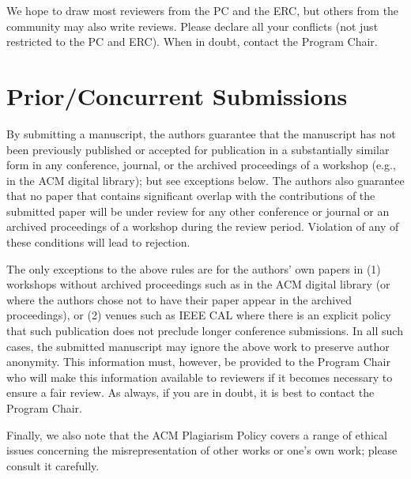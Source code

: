 \documentclass{sig-alternate}
\begin{document}
We hope to draw most reviewers from the PC and the ERC, but others from the community may also write reviews. Please declare all your conflicts (not just restricted to the PC and ERC). When in doubt, contact the Program Chair.

\section{Prior/Concurrent Submissions}

By submitting a manuscript, the authors guarantee that the manuscript has not been previously published or accepted for publication in a substantially similar form in any conference, journal, or the archived proceedings of a workshop (e.g., in the ACM digital library); but see exceptions below. The authors also guarantee that no paper that contains significant overlap with the contributions of the submitted paper will be under review for any other conference or journal or an archived proceedings of a workshop during the review period. Violation of any of these conditions will lead to rejection.

The only exceptions to the above rules are for the authors' own papers in (1) workshops without archived proceedings such as in the ACM digital library (or where the authors chose not to have their paper appear in the archived proceedings), or (2) venues such as IEEE CAL where there is an explicit policy that such publication does not preclude longer conference submissions. In all such cases, the submitted manuscript may ignore the above work to preserve author anonymity. This information must, however, be provided to the Program Chair who  will make this information available to reviewers if it becomes necessary to ensure a fair review. As always, if you are in doubt, it is best to contact the Program Chair.

Finally, we also note that the ACM Plagiarism Policy covers a range of ethical issues concerning the misrepresentation of other works or one's own work; please consult it carefully.




\end{document}

